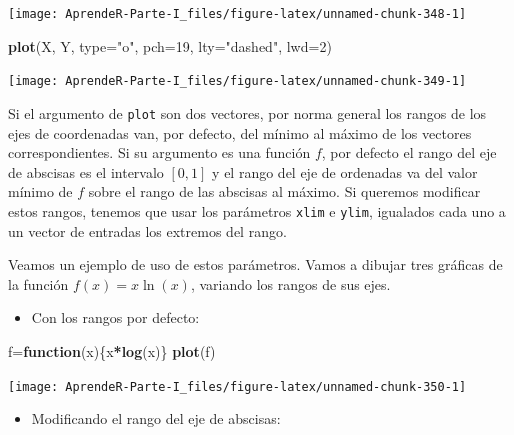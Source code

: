 \documentclass[]{book}
\newenvironment{Shaded}{\begin{snugshade}}{\end{snugshade}}
\newcommand{\ControlFlowTok}[1]{\textcolor[rgb]{0.13,0.29,0.53}{\textbf{#1}}}
\newcommand{\DataTypeTok}[1]{\textcolor[rgb]{0.13,0.29,0.53}{#1}}
\newcommand{\DecValTok}[1]{\textcolor[rgb]{0.00,0.00,0.81}{#1}}
\newcommand{\KeywordTok}[1]{\textcolor[rgb]{0.13,0.29,0.53}{\textbf{#1}}}
\newcommand{\NormalTok}[1]{#1}
\newcommand{\OperatorTok}[1]{\textcolor[rgb]{0.81,0.36,0.00}{\textbf{#1}}}
\newcommand{\StringTok}[1]{\textcolor[rgb]{0.31,0.60,0.02}{#1}}
\providecommand{\tightlist}{%
  \setlength{\itemsep}{0pt}\setlength{\parskip}{0pt}}
\theoremstyle{definition}
\theoremstyle{definition}
\theoremstyle{definition}
\theoremstyle{remark}
\begin{document}
\begin{center}\texttt{[image: AprendeR-Parte-I\_files/figure-latex/unnamed-chunk-348-1]} \end{center}

\begin{Shaded}
\begin{Highlighting}[]
\KeywordTok{plot}\NormalTok{(X, Y, }\DataTypeTok{type=}\StringTok{"o"}\NormalTok{, }\DataTypeTok{pch=}\DecValTok{19}\NormalTok{, }\DataTypeTok{lty=}\StringTok{"dashed"}\NormalTok{, }\DataTypeTok{lwd=}\DecValTok{2}\NormalTok{)}
\end{Highlighting}
\end{Shaded}

\begin{center}\texttt{[image: AprendeR-Parte-I\_files/figure-latex/unnamed-chunk-349-1]} \end{center}

Si el argumento de \texttt{plot} son dos vectores, por norma general los rangos de los ejes de coordenadas van, por defecto, del mínimo al máximo de los vectores correspondientes. Si su argumento es una función \(f\), por defecto el rango del eje de abscisas es el intervalo \([0, 1]\) y el rango del eje de ordenadas va del valor mínimo de \(f\) sobre el rango de las abscisas al máximo. Si queremos modificar estos rangos, tenemos que usar los parámetros \texttt{xlim} e \texttt{ylim}, igualados cada uno a un vector de entradas los extremos del rango.

Veamos un ejemplo de uso de estos parámetros. Vamos a dibujar tres gráficas de la función \(f(x)=x\ln(x)\), variando los rangos de sus ejes.

\begin{itemize}
\tightlist
\item
  Con los rangos por defecto:
\end{itemize}

\begin{Shaded}
\begin{Highlighting}[]
\NormalTok{f=}\ControlFlowTok{function}\NormalTok{(x)\{x}\OperatorTok{*}\KeywordTok{log}\NormalTok{(x)\}}
\KeywordTok{plot}\NormalTok{(f)    }
\end{Highlighting}
\end{Shaded}

\begin{center}\texttt{[image: AprendeR-Parte-I\_files/figure-latex/unnamed-chunk-350-1]} \end{center}

\begin{itemize}
\tightlist
\item
  Modificando el rango del eje de abscisas:
\end{itemize}
\end{document}
